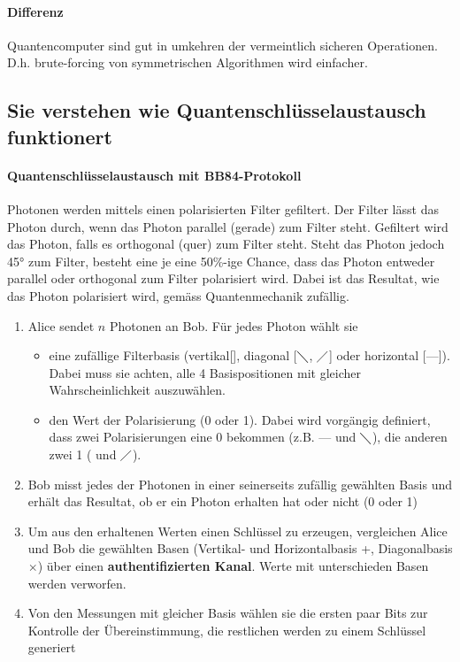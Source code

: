 \documentclass[10pt,a4paper]{article}
\begin{document}
\paragraph*{Differenz}Quantencomputer sind gut in umkehren der vermeintlich sicheren Operationen. D.h. brute-forcing von symmetrischen Algorithmen wird einfacher.

\pagebreak
\subsection*{Sie verstehen wie Quantenschlüsselaustausch funktionert}
\paragraph*{Quantenschlüsselaustausch mit BB84-Protokoll}
Photonen werden mittels einen polarisierten Filter gefiltert. Der Filter lässt das Photon durch, wenn das Photon parallel (gerade) zum Filter steht. Gefiltert wird das Photon, falls es orthogonal (quer) zum Filter steht. Steht das Photon jedoch 45° zum Filter, besteht eine je eine 50\%-ige Chance, dass das Photon entweder parallel oder orthogonal zum Filter polarisiert wird. Dabei ist das Resultat, wie das Photon polarisiert wird, gemäss Quantenmechanik zufällig.
\begin{enumerate}[noitemsep,topsep=0pt,leftmargin=*]
    \item Alice sendet $n$ Photonen an Bob. Für jedes Photon wählt sie
    \begin{itemize}[noitemsep,topsep=0pt,leftmargin=*]
        \item eine zufällige Filterbasis (vertikal[\textbar], diagonal [$\diagdown$, $\diagup$] oder horizontal [---]). Dabei muss sie achten, alle 4 Basispositionen mit gleicher Wahrscheinlichkeit auszuwählen.
        \item den Wert der Polarisierung (0 oder 1). Dabei wird vorgängig definiert, dass zwei Polarisierungen eine 0 bekommen (z.B. --- und $\diagdown$), die anderen zwei 1 (\textbar{} und $\diagup$).
    \end{itemize}
    \item Bob misst jedes der Photonen in einer seinerseits zufällig gewählten Basis und erhält das Resultat, ob er ein Photon erhalten hat oder nicht (0 oder 1)
    \item Um aus den erhaltenen Werten einen Schlüssel zu erzeugen, vergleichen Alice und Bob die gewählten Basen (Vertikal- und Horizontalbasis +, Diagonalbasis $\times$) über einen \textbf{authentifizierten Kanal}. Werte mit unterschieden Basen werden verworfen.
    \item Von den Messungen mit gleicher Basis wählen sie die ersten paar Bits zur Kontrolle der Übereinstimmung, die restlichen werden zu einem Schlüssel generiert
\end{enumerate}
\end{document}
